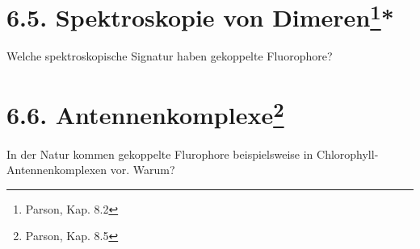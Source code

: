 \section{6.5. Spektroskopie von Dimeren\protect\footnote{Parson, Kap. 8.2}\hfill **} 

Welche spektroskopische Signatur haben gekoppelte
Fluorophore?

\section{6.6. Antennenkomplexe\protect\footnote{Parson, Kap. 8.5}\hfill *} 

In der Natur kommen gekoppelte Flurophore beispielsweise in
Chlorophyll-Antennenkomplexen vor. Warum?




\printbibliography[segment=\therefsegment,heading=subbibliography]
